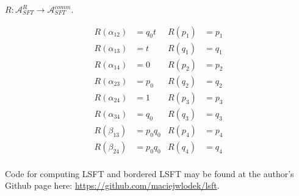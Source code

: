 \documentclass[a4paper,final, reqno]{amsart}
\theoremstyle{plain}
\theoremstyle{definition}
\newcommand{\A}{\mathcal{A}}
\begin{document}
		
		$R: \A^R_{SFT} \to \A_{SFT}^{comm}$. 
		
		\begin{align*}
			R(\alpha_{12}) &= q_0t & R(p_1)&=p_1\\
			R(\alpha_{13}) &= t & R(q_1)&=q_1\\
			R(\alpha_{14}) &= 0 & R(p_2)&=p_2\\
			R(\alpha_{23}) &= p_0 & R(q_2)&=q_2 \\
			R(\alpha_{24}) &= 1 & R(p_3)&=p_3\\
			R(\alpha_{34}) &= q_0 & R(q_3)&=q_3 \\
			R(\beta_{13}) &= p_0q_0 & R(p_4)&=p_4 \\
			R(\beta_{24}) &= p_0q_0 & R(q_4)&=q_4\\	
		\end{align*}
		
		
		
				
		
		
		
		
		Code for computing LSFT and bordered LSFT may be found at the author's Github page here: \url{https://github.com/maciejwlodek/lsft}.
		
		
		
		
		
				
		{}
		
		
	
\end{document}
